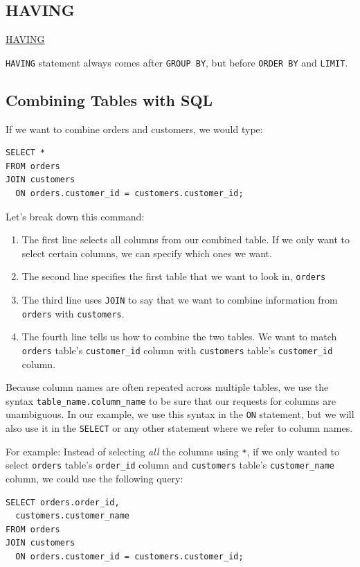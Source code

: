 \documentclass[a4paper, 12pt]{article}
\begin{document}
\subsection{HAVING}
\href{https://www.codecademy.com/courses/learn-sql/lessons/aggregate-functions/exercises/having?action=resume_content_item}{HAVING}

\verb|HAVING| statement always comes after \verb|GROUP BY|, but before \verb|ORDER BY| and \verb|LIMIT|.

\subsection{Combining Tables with SQL}
If we want to combine orders and customers, we would type:
\begin{verbatim}
SELECT *
FROM orders
JOIN customers
  ON orders.customer_id = customers.customer_id;
\end{verbatim}
Let's break down this command:
\begin{enumerate}
\item The first line selects all columns from our combined table. If we only want to select certain columns, we can specify which ones we want.

\item The second line specifies the first table that we want to look in, \verb|orders|

\item The third line uses \verb|JOIN| to say that we want to combine information from \verb|orders| with \verb|customers|.

\item The fourth line tells us how to combine the two tables. We want to match \verb|orders| table's \verb|customer_id| column with \verb|customers| table's \verb|customer_id| column.

\end{enumerate}
Because column names are often repeated across multiple tables, we use the syntax \verb|table_name.column_name| to be sure that our requests for columns are unambiguous. In our example, we use this syntax in the \verb|ON| statement, but we will also use it in the \verb|SELECT| or any other statement where we refer to column names.

For example: Instead of selecting \textit{all} the columns using \verb|*|, if we only wanted to select \verb|orders| table's \verb|order_id| column and \verb|customers| table's \verb|customer_name| column, we could use the following query:
\begin{verbatim}
SELECT orders.order_id,
  customers.customer_name
FROM orders
JOIN customers
  ON orders.customer_id = customers.customer_id;
\end{verbatim}
\end{document}
